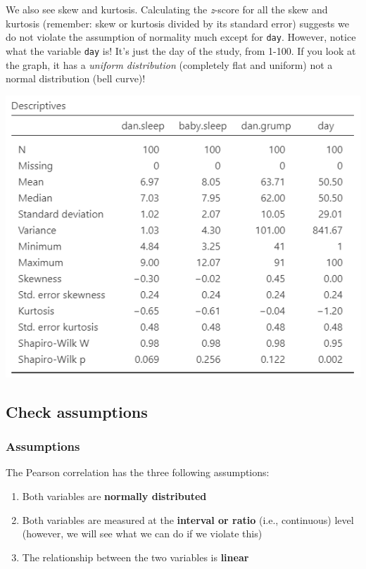\documentclass[
]{book}
\begin{document}
We also see skew and kurtosis. Calculating the \emph{z}-score for all the skew and kurtosis (remember: skew or kurtosis divided by its standard error) suggests we do not violate the assumption of normality much except for \texttt{day}. However, notice what the variable \texttt{day} is! It's just the day of the study, from 1-100. If you look at the graph, it has a \emph{uniform distribution} (completely flat and uniform) not a normal distribution (bell curve)!

\includegraphics{images/08-correlation/correlation-descriptives.png}

\hypertarget{check-assumptions-6}{%
\subsection{Check assumptions}\label{check-assumptions-6}}

\hypertarget{assumptions-6}{%
\subsubsection{Assumptions}\label{assumptions-6}}

The Pearson correlation has the three following assumptions:

\begin{enumerate}
\def\labelenumi{\arabic{enumi}.}
\item
  Both variables are \textbf{normally distributed}
\item
  Both variables are measured at the \textbf{interval or ratio} (i.e., continuous) level (however, we will see what we can do if we violate this)
\item
  The relationship between the two variables is \textbf{linear}
\end{enumerate}
\end{document}

